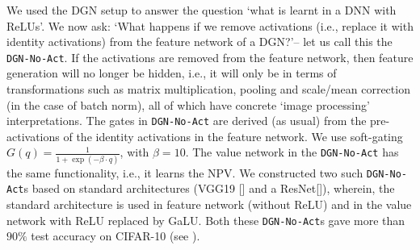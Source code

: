 We used the DGN setup to answer the question `what is learnt in a DNN with ReLUs'. We now ask: `What happens if we remove activations (i.e., replace it with identity activations) from the feature network of a DGN?'-- let us call this the \texttt{DGN-No-Act}. If the activations are removed from the feature network, then feature generation will no longer be hidden, i.e., it will only be in terms of transformations such as matrix multiplication, pooling and scale/mean correction (in the case of batch norm), all of which have concrete `image processing'  interpretations. The gates in \texttt{DGN-No-Act} are derived (as usual) from the pre-activations of the identity activations in the feature network. We use soft-gating $G(q)=\frac{1}{1+\exp({-\beta\cdot q})}$, with $\beta=10$.  The value network in the \texttt{DGN-No-Act} has the same functionality, i.e., it learns the NPV. We constructed two such \texttt{DGN-No-Act}s based on standard architectures (VGG19 [] and a ResNet[]), wherein, the standard architecture is used in feature network (without ReLU) and in the value network with ReLU replaced by GaLU. Both these \texttt{DGN-No-Act}s gave more than $90\%$ test accuracy on CIFAR-10 (see ).


